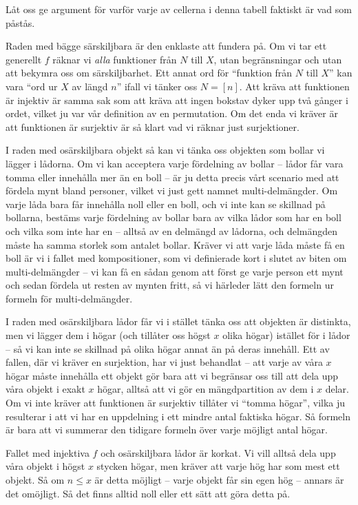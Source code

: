 \documentclass[nobib]{tufte-handout}
\begin{document}
Låt oss ge argument för varför varje av cellerna i denna tabell faktiskt är vad som påstås.

Raden med bägge särskiljbara är den enklaste att fundera på. Om vi tar ett generellt $f$ räknar vi \emph{alla} funktioner från $N$ till $X$, utan begränsningar och utan att bekymra oss om särskiljbarhet. Ett annat ord för ``funktion från $N$ till $X$'' kan vara ``ord ur $X$ av längd $n$'' ifall vi tänker oss $N = [n]$. Att kräva att funktionen är injektiv är samma sak som att kräva att ingen bokstav dyker upp två gånger i ordet, vilket ju var vår definition av en permutation. Om det enda vi kräver är att funktionen är surjektiv är så klart vad vi räknar just surjektioner.

I raden med osärskiljbara objekt så kan vi tänka oss objekten som bollar vi lägger i lådorna. Om vi kan acceptera varje fördelning av bollar -- lådor får vara tomma eller innehålla mer än en boll -- är ju detta precis vårt scenario med att fördela mynt bland personer, vilket vi just gett namnet multi-delmängder. Om varje låda bara får innehålla noll eller en boll, och vi inte kan se skillnad på bollarna, bestäms varje fördelning av bollar bara av vilka lådor som har en boll och vilka som inte har en -- alltså av en delmängd av lådorna, och delmängden måste ha samma storlek som antalet bollar. Kräver vi att varje låda måste få en boll är vi i fallet med kompositioner, som vi definierade kort i slutet av biten om multi-delmängder -- vi kan få en sådan genom att först ge varje person ett mynt och sedan fördela ut resten av mynten fritt, så vi härleder lätt den formeln ur formeln för multi-delmängder.

I raden med osärskiljbara lådor får vi i stället tänka oss att objekten är distinkta, men vi lägger dem i högar (och tillåter oss högst $x$ olika högar) istället för i lådor -- så vi kan inte se skillnad på olika högar annat än på deras innehåll. Ett av fallen, där vi kräver en surjektion, har vi just behandlat -- att varje av våra $x$ högar måste innehålla ett objekt gör bara att vi begränsar oss till att dela upp våra objekt i exakt $x$ högar, alltså att vi gör en mängdpartition av dem i $x$ delar. Om vi inte kräver att funktionen är surjektiv tillåter vi ``tomma högar'', vilka ju resulterar i att vi har en uppdelning i ett mindre antal faktiska högar. Så formeln är bara att vi summerar den tidigare formeln över varje möjligt antal högar.

Fallet med injektiva $f$ och osärskiljbara lådor är korkat. Vi vill alltså dela upp våra objekt i högst $x$ stycken högar, men kräver att varje hög har som mest ett objekt. Så om $n \leq x$ är detta möjligt -- varje objekt får sin egen hög -- annars är det omöjligt. Så det finns alltid noll eller ett sätt att göra detta på.
\end{document}
